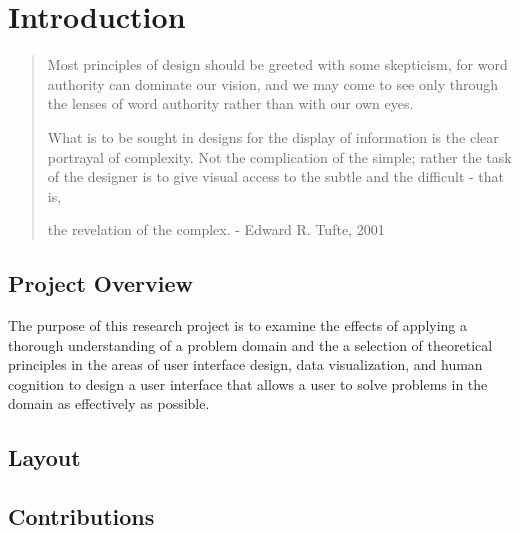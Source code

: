 \resetdatestamp

\chapter{Introduction}

\begin{quote}
Most principles of design should be greeted with some skepticism, for word authority can dominate our vision, and we may come to see only through the lenses of word authority rather than with our own eyes.

What is to be sought in designs for the display of information is the clear portrayal of complexity. Not the complication of the simple; rather the task of the designer is to give visual access to the subtle and the difficult - that is,

the revelation of the complex. - Edward R. Tufte, 2001
\end{quote}

\section{Project Overview}

The purpose of this research project is to examine the effects of applying a thorough understanding of a problem domain and the a selection of theoretical principles in the areas of user interface design, data visualization, and human cognition to design a user interface that allows a user to solve problems in the domain as effectively as possible. 

\section{Layout}

\section{Contributions}
